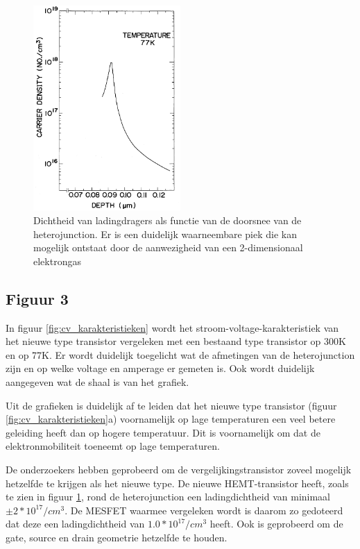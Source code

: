 \documentclass[11pt]{article}
\begin{document}
\begin{figure}[h]
  \begin{center}
\includegraphics[width=0.5\textwidth]{carrier_profile_depth.png}
\caption{Dichtheid van ladingdragers als functie van de doorsnee van de heterojunction. Er is een duidelijk waarneembare piek die kan mogelijk ontstaat door de aanwezigheid van een 2-dimensionaal elektrongas}
\label{fig:carrierprofile}
  \end{center}
\end{figure}

\subsection{Figuur 3}
In figuur \ref{fig:cv_karakteristieken} wordt het stroom-voltage-karakteristiek van het nieuwe type transistor vergeleken met een bestaand type transistor op 300K en op 77K. Er wordt duidelijk toegelicht wat de afmetingen van de heterojunction zijn en op welke voltage en amperage er gemeten is. Ook wordt duidelijk aangegeven wat de shaal is van het grafiek.

Uit de grafieken is duidelijk af te leiden dat het nieuwe type transistor (figuur \ref{fig:cv_karakteristieken}a) voornamelijk op lage temperaturen een veel betere geleiding heeft dan op hogere temperatuur. Dit is voornamelijk om dat de elektronmobiliteit toeneemt op lage temperaturen.

De onderzoekers hebben geprobeerd om de vergelijkingstransistor zoveel mogelijk hetzelfde te krijgen als het nieuwe type. De nieuwe HEMT-transistor heeft, zoals te zien in figuur \ref{fig:carrierprofile}, rond de heterojunction een ladingdichtheid van minimaal $\pm2*10^{17}/cm^3$. De MESFET waarmee vergeleken wordt is daarom zo gedoteerd dat deze een ladingdichtheid van $1.0 * 10^{17}/cm^3$ heeft. Ook is geprobeerd om de gate, source en drain geometrie hetzelfde te houden.
\end{document}
